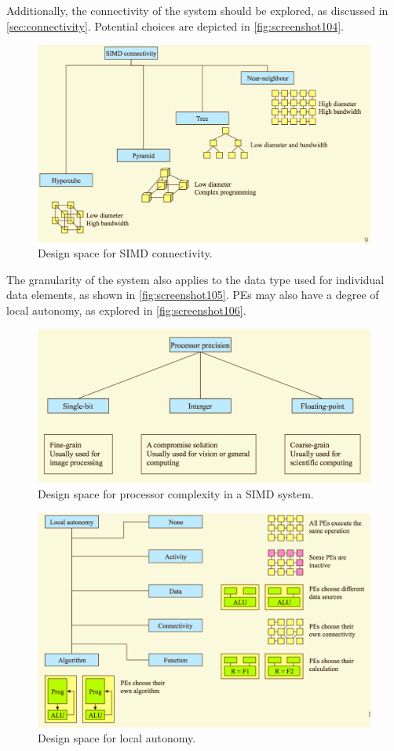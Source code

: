 Additionally, the connectivity of the system should be explored, as discussed in \autoref{sec:connectivity}. Potential choices are depicted in \autoref{fig:screenshot104}.

\begin{figure}
\centering
\includegraphics[width=0.7\linewidth]{screenshot104}
\caption{Design space for SIMD connectivity.}
\label{fig:screenshot104}
\end{figure}

The granularity of the system also applies to the data type used for individual data elements, as shown in \autoref{fig:screenshot105}. PEs may also have a degree of local autonomy, as explored in \autoref{fig:screenshot106}.

\begin{figure}
\centering
\includegraphics[width=0.7\linewidth]{screenshot105}
\caption{Design space for processor complexity in a SIMD system.}
\label{fig:screenshot105}
\end{figure}

\begin{figure}
\centering
\includegraphics[width=0.7\linewidth]{screenshot106}
\caption{Design space for local autonomy.}
\label{fig:screenshot106}
\end{figure}

